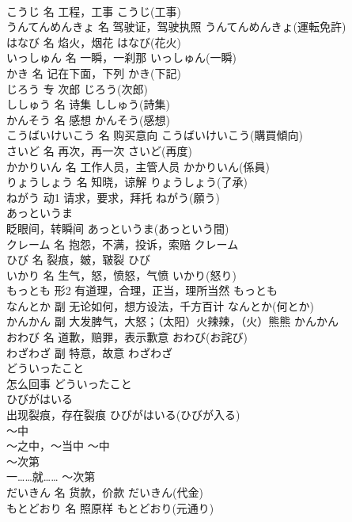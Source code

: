\documentclass[8pt]{extreport}
\begin{document}
\begin{CJK}{UTF8}{min}
\\	こうじ	名	工程，工事	こうじ(工事)	
\\	うんてんめんきょ	名	驾驶证，驾驶执照	うんてんめんきょ(運転免許)	
\\	はなび	名	焰火，烟花	はなび(花火)	
\\	いっしゅん	名	一瞬，一刹那	いっしゅん(一瞬)	
\\	かき	名	记在下面，下列	かき(下記)	
\\	じろう	专	次郎	じろう(次郎)	
\\	ししゅう	名	诗集	ししゅう(詩集)	
\\	かんそう	名	感想	かんそう(感想)	
\\	こうばいけいこう	名	购买意向	こうばいけいこう(購買傾向)	
\\	さいど	名	再次，再一次	さいど(再度)	
\\	かかりいん	名	工作人员，主管人员	かかりいん(係員)	
\\	りょうしょう	名	知晓，谅解	りょうしょう(了承)	
\\	ねがう	动1	请求，要求，拜托	ねがう(願う)	
\\	あっというま	
\\	眨眼间，转瞬间	あっというま(あっという間)	
\\	クレーム	名	抱怨，不满，投诉，索赔	クレーム	
\\	ひび	名	裂痕，皴，皲裂	ひび	
\\	いかり	名	生气，怒，愤怒，气愤	いかり(怒り)	
\\	もっとも	形2	有道理，合理，正当，理所当然	もっとも	
\\	なんとか	副	无论如何，想方设法，千方百计	なんとか(何とか)	
\\	かんかん	副	大发脾气，大怒；（太阳）火辣辣，（火）熊熊	かんかん	
\\	おわび	名	道歉，赔罪，表示歉意	おわび(お詫び)	
\\	わざわざ	副	特意，故意	わざわざ	
\\	どういったこと	
\\	怎么回事	どういったこと	
\\	ひびがはいる	
\\	出现裂痕，存在裂痕	ひびがはいる(ひびが入る)	
\\	～中	
\\	～之中，～当中	～中	
\\	～次第	
\\	一……就……	～次第	
\\	だいきん	名	货款，价款	だいきん(代金)	
\\	もとどおり	名	照原样	もとどおり(元通り)	

\end{CJK}
\end{document}
